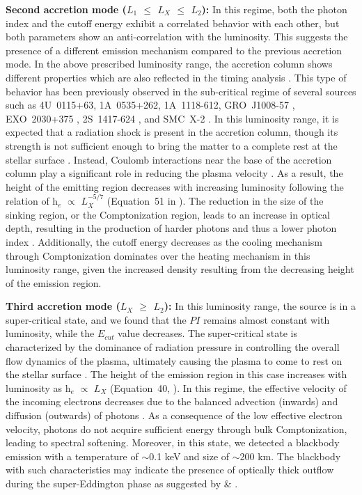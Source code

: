 \documentclass[twocolumn,trackchanges]{aastex631}
\begin{document}
{\bf Second accretion mode ($L_{1}$ $\leq$ $L_{X}$ $\leq$ $L_{2}$): } In this regime, both the photon index and the cutoff energy exhibit a correlated behavior with each other, but both parameters show an anti-correlation with the luminosity. This suggests the presence of a different emission mechanism compared to the previous accretion mode. In the above prescribed luminosity range, the accretion column shows different properties which are also reflected in the timing analysis \citep{2020ApJ...902...18K}. This type of behavior has been previously observed in the sub-critical regime of several sources such as 4U~0115+63, 1A~0535+262, 1A~1118-612, GRO~J1008-57 \citep{2013A&A...551A...1R}, EXO~2030+375 \citep{Epili2017MNRAS.472.3455E,2021JApA...42...33J}, 2S~1417-624 \citep{2018MNRAS.479.5612G}, and SMC~X-2 \citep{2023MNRAS.521.3951J}. In this luminosity range, it is expected that a radiation shock is present in the accretion column, though its strength is not sufficient enough to bring the matter to a complete rest at the stellar surface \citep{1976MNRAS.175..395B,2012A&A...544A.123B}. Instead, Coulomb interactions near the base of the accretion column play a significant role in reducing the plasma velocity \citep{1991ApJ...367..575B,1993ApJ...418..874N}. As a result, the height of the emitting region decreases with increasing luminosity following the relation of h$_{e}$ $\propto$ $L^{-5/7}_{X}$ (Equation~51 in \citealt{2012A&A...544A.123B}). The reduction in the size of the sinking region, or the Comptonization region, leads to an increase in optical depth, resulting in the production of harder photons and thus a lower photon index \citep{2012A&A...544A.123B}. Additionally, the cutoff energy decreases as the cooling mechanism through Comptonization dominates over the heating mechanism in this luminosity range, given the increased density resulting from the decreasing height of the emission region.

{\bf Third accretion mode ($L_{X}$ $\geq$ $L_{2}$):} In this luminosity range, the source is in a super-critical state, and we found that the $PI$ remains almost constant with luminosity, while the $E_{cut}$ value decreases. The super-critical state is characterized by the dominance of radiation pressure in controlling the overall flow dynamics of the plasma, ultimately causing the plasma to come to rest on the stellar surface \citep{1973NPhS..246....1D,1976MNRAS.175..395B}. The height of the emission region in this case increases with luminosity as h$_{e}$ $\propto$ $L_{X}$ (Equation~40, \citealt{2012A&A...544A.123B}). In this regime, the effective velocity of the incoming electrons decreases due to the balanced advection (inwards) and diffusion (outwards) of photons \citep{2012A&A...544A.123B}. As a consequence of the low effective electron velocity, photons do not acquire sufficient energy through bulk Comptonization, leading to spectral softening. Moreover, in this state, we detected a blackbody emission with a temperature of $\sim$0.1 keV and size of $\sim$200 km. The blackbody with such characteristics may indicate the presence of optically thick outflow during the super-Eddington phase as suggested by \citet{2019ApJ...873...19T} \& \citet{2021MNRAS.500..565B}.
\end{document}
